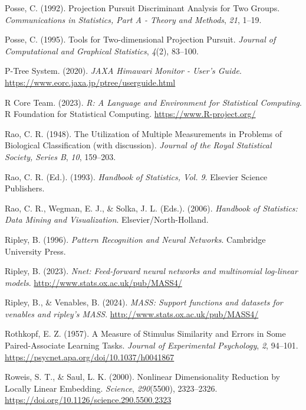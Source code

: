 \documentclass[
  letterpaper,
]{krantz}
\newlength{\cslhangindent}
\newenvironment{CSLReferences}[2] %
 {\begin{list}{}{%
  \setlength{\itemindent}{0pt}
  \setlength{\leftmargin}{0pt}
  \setlength{\parsep}{0pt}
  \ifodd #1
   \setlength{\leftmargin}{\cslhangindent}
   \setlength{\itemindent}{-1\cslhangindent}
  \fi
  \setlength{\itemsep}{#2\baselineskip}}}
 {\end{list}}
\begin{document}
\begin{CSLReferences}{1}{0}
Posse, C. (1992). Projection {P}ursuit {D}iscriminant {A}nalysis for
{T}wo {G}roups. \emph{Communications in Statistics, Part A - Theory and
Methods}, \emph{21}, 1--19.

Posse, C. (1995). Tools for {T}wo-dimensional {P}rojection {P}ursuit.
\emph{Journal of Computational and Graphical Statistics}, \emph{4}(2),
83--100.

P-Tree System. (2020). \emph{{JAXA Himawari Monitor - User's Guide}}.
\url{https://www.eorc.jaxa.jp/ptree/userguide.html}

R Core Team. (2023). \emph{R: A {L}anguage and {E}nvironment for
{S}tatistical {C}omputing}. R Foundation for Statistical Computing.
\url{https://www.R-project.org/}

Rao, C. R. (1948). The {U}tilization of {M}ultiple {M}easurements in
{P}roblems of {B}iological {C}lassification (with discussion).
\emph{Journal of the Royal Statistical Society, Series B}, \emph{10},
159--203.

Rao, C. R. (Ed.). (1993). \emph{{H}andbook of {S}tatistics, {V}ol. 9}.
Elsevier Science Publishers.

Rao, C. R., Wegman, E. J., \& Solka, J. L. (Eds.). (2006).
\emph{Handbook of {S}tatistics: {D}ata {M}ining and {V}isualization}.
Elsevier/North-Holland.

Ripley, B. (1996). \emph{Pattern {R}ecognition and {N}eural {N}etworks}.
Cambridge University Press.

Ripley, B. (2023). \emph{Nnet: Feed-forward neural networks and
multinomial log-linear models}.
\url{http://www.stats.ox.ac.uk/pub/MASS4/}

Ripley, B., \& Venables, B. (2024). \emph{MASS: Support functions and
datasets for venables and ripley's MASS}.
\url{http://www.stats.ox.ac.uk/pub/MASS4/}

Rothkopf, E. Z. (1957). A {M}easure of {S}timulus {S}imilarity and
{E}rrors in {S}ome {P}aired-{A}ssociate {L}earning {T}asks.
\emph{Journal of Experimental Psychology}, \emph{2}, 94--101.
\url{https://psycnet.apa.org/doi/10.1037/h0041867}

Roweis, S. T., \& Saul, L. K. (2000). Nonlinear {D}imensionality
{R}eduction by {L}ocally {L}inear {E}mbedding. \emph{Science},
\emph{290}(5500), 2323--2326.
\url{https://doi.org/10.1126/science.290.5500.2323}


\end{CSLReferences}
\end{document}
